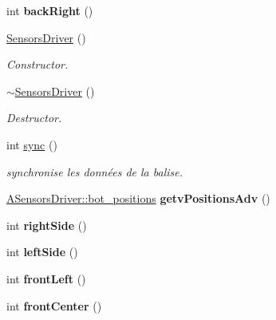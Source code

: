 \begin{DoxyCompactItemize}
int {\bfseries back\+Right} ()
\item 
\mbox{\label{classSensorsDriver_a3da0016428e39e04021a7398ddec6cd7}} 
\hyperlink{classSensorsDriver_a3da0016428e39e04021a7398ddec6cd7}{Sensors\+Driver} ()
\begin{DoxyCompactList}\small\item\em Constructor. \end{DoxyCompactList}\item 
\mbox{\label{classSensorsDriver_aeb5bb8554d3bacd1cc267eedc2a8fb4d}} 
\hyperlink{classSensorsDriver_aeb5bb8554d3bacd1cc267eedc2a8fb4d}{$\sim$\+Sensors\+Driver} ()
\begin{DoxyCompactList}\small\item\em Destructor. \end{DoxyCompactList}\item 
int \hyperlink{classSensorsDriver_a1bfbcc82461257094ed185fa2017afad}{sync} ()
\begin{DoxyCompactList}\small\item\em synchronise les données de la balise. \end{DoxyCompactList}\item 
\mbox{\label{classSensorsDriver_ac2b9d1fbaae6cbf09547f2a2d2e41af9}} 
\hyperlink{classASensorsDriver_a9743a29ef7d4faebd915f096f07bf729}{A\+Sensors\+Driver\+::bot\+\_\+positions} {\bfseries getv\+Positions\+Adv} ()
\item 
\mbox{\label{classSensorsDriver_ac1c1e82e2e28051147677faf1b002d0a}} 
int {\bfseries right\+Side} ()
\item 
\mbox{\label{classSensorsDriver_af30421d64581a0094f2762cf506032d9}} 
int {\bfseries left\+Side} ()
\item 
\mbox{\label{classSensorsDriver_ad9f2ff84de03a165c10848f8d9f21930}} 
int {\bfseries front\+Left} ()
\item 
\mbox{\label{classSensorsDriver_a3378e277cfb43319eb7b59b9b3fe3d12}} 
int {\bfseries front\+Center} ()
\item 
\mbox{\label{classSensorsDriver_a42e9d37f155cadf71e325bed5f46741e}} 

\end{DoxyCompactItemize}
